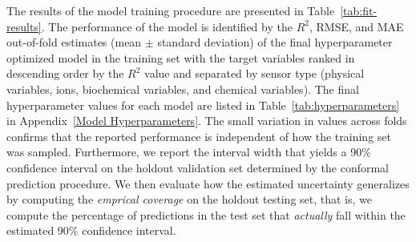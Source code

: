 \documentclass[remotesensing,article,submit,pdftex,moreauthors]{Definitions/mdpi}
\begin{document}
The results of the model training procedure are presented in Table~\ref{tab:fit-results}. The performance of the model is identified by the $R^2$, RMSE, and MAE out-of-fold estimates (mean $\pm$ standard deviation) of the final hyperparameter optimized model in the training set with the target variables ranked in descending order by the $R^2$ value and separated by sensor type (physical variables, ions, biochemical variables, and chemical variables). The final hyperparameter values for each model are listed in Table~\ref{tab:hyperparameters} in Appendix~\ref{Model Hyperparameters}. The small variation in values across folds confirms that the reported performance is independent of how the training set was sampled. Furthermore, we report the interval width that yields a 90\% confidence interval on the holdout validation set determined by the conformal prediction procedure. We then evaluate how the estimated uncertainty generalizes by computing the \textit{emprical coverage} on the holdout testing set, that is, we compute the percentage of predictions in the test set that \textit{actually} fall within the estimated 90\% confidence interval. 
\end{document}
